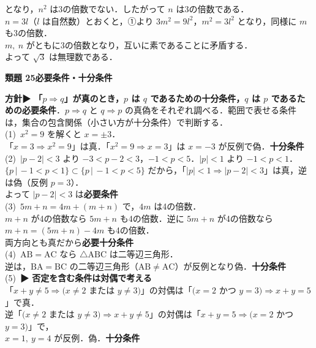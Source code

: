 \documentclass[a4paper,11pt]{ltjsarticle}
\newcommand{\ans}[2]{\Needspace{5\baselineskip}\vspace{6pt}%
  {\sffamily\bfseries 類題 #1\quad #2}\par}
\newcommand{\point}[1]{\textsf{\bfseries ▶ #1}}
\begin{document}
\begin{kai}
\hspace*{1.5em}となり，$n^2$ は3の倍数でない．したがって $n$ は3の倍数である．\\
\hspace*{1.5em}$n=3l$（$l$ は自然数）とおくと，①より $3m^2=9l^2$，\quad $m^2=3l^2$ となり，同様に $m$ も3の倍数．\\
\hspace*{1.5em}$m,\ n$ がともに3の倍数となり，互いに素であることに矛盾する．\\
\hspace*{1.5em}よって $\sqrt3$ は無理数である．
\end{kai}

\ans{25}{必要条件・十分条件}
\begin{kai}
\textbf{方針}\quad \point{「$p\Rightarrow q$」が真のとき，$p$ は $q$ であるための十分条件，$q$ は $p$ であるための必要条件}．$p\Rightarrow q$ と $q\Rightarrow p$ の真偽をそれぞれ調べる．範囲で表せる条件は，集合の包含関係（小さい方が十分条件）で判断する．\\[2pt]
(1)\ $x^2=9$ を解くと $x=\pm3$．\\
\hspace*{1.5em}「$x=3\Rightarrow x^2=9$」は真．「$x^2=9\Rightarrow x=3$」は $x=-3$ が反例で偽．\quad \textbf{十分条件}\\[2pt]
(2)\ $|p-2|<3$ より $-3<p-2<3$，\quad $-1<p<5$．\quad $|p|<1$ より $-1<p<1$．\\
\hspace*{1.5em}$\{p\,|\,-1<p<1\}\subset\{p\,|\,-1<p<5\}$ だから，「$|p|<1\Rightarrow|p-2|<3$」は真，逆は偽（反例 $p=3$）．\\
\hspace*{1.5em}よって $|p-2|<3$ は\quad \textbf{必要条件}\\[2pt]
(3)\ $5m+n=4m+(m+n)$ で，$4m$ は4の倍数．\\
\hspace*{1.5em}$m+n$ が4の倍数なら $5m+n$ も4の倍数．逆に $5m+n$ が4の倍数なら $m+n=(5m+n)-4m$ も4の倍数．\\
\hspace*{1.5em}両方向とも真だから\quad \textbf{必要十分条件}\\[2pt]
(4)\ $\mathrm{AB}=\mathrm{AC}$ なら $\triangle\mathrm{ABC}$ は二等辺三角形．\\
\hspace*{1.5em}逆は，$\mathrm{BA}=\mathrm{BC}$ の二等辺三角形（$\mathrm{AB}\neq\mathrm{AC}$）が反例となり偽．\quad \textbf{十分条件}\\[2pt]
(5)\ \point{否定を含む条件は対偶で考える}\\
\hspace*{1.5em}「$x+y\neq5\Rightarrow(x\neq2$ または $y\neq3)$」の対偶は「$(x=2$ かつ $y=3)\Rightarrow x+y=5$」で真．\\
\hspace*{1.5em}逆「$(x\neq2$ または $y\neq3)\Rightarrow x+y\neq5$」の対偶は「$x+y=5\Rightarrow(x=2$ かつ $y=3)$」で，\\
\hspace*{1.5em}$x=1,\ y=4$ が反例．偽．\quad \textbf{十分条件}
\end{kai}
\end{document}
